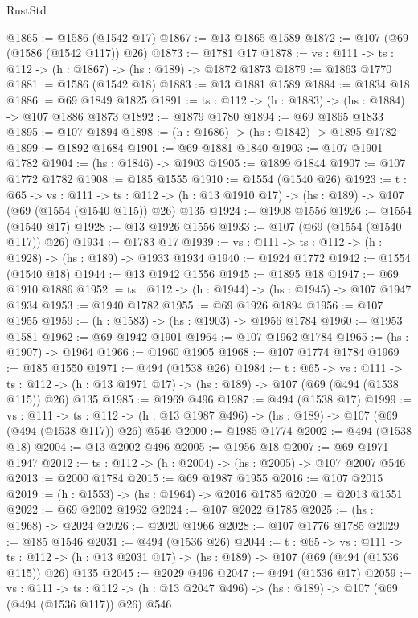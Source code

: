 \begin{lexlean}{RustStd}
\begin{coremodule}
@1865 := @1586 (@1542 @17)
@1867 := @13 @1865 @1589
@1872 := @107 (@69 (@1586 (@1542 @117)) @26)
@1873 := @1781 @17
@1878 := {vs : @111} -> {ts : @112} -> (h : @1867) -> (hs : @189) -> @1872 @1873
@1879 := @1863 @1770
@1881 := @1586 (@1542 @18)
@1883 := @13 @1881 @1589
@1884 := @1834 @18
@1886 := @69 @1849 @1825
@1891 := {ts : @112} -> (h : @1883) -> (hs : @1884) -> @107 @1886 @1873
@1892 := @1879 @1780
@1894 := @69 @1865 @1833
@1895 := @107 @1894
@1898 := (h : @1686) -> (hs : @1842) -> @1895 @1782
@1899 := @1892 @1684
@1901 := @69 @1881 @1840
@1903 := @107 @1901 @1782
@1904 := (hs : @1846) -> @1903
@1905 := @1899 @1844
@1907 := @107 @1772 @1782
@1908 := @185 @1555
@1910 := @1554 (@1540 @26)
@1923 := {t : @65} ->
  {vs : @111} ->
  {ts : @112} -> (h : @13 @1910 @17) -> (hs : @189) -> @107 (@69 (@1554 (@1540 @115)) @26) @135
@1924 := @1908 @1556
@1926 := @1554 (@1540 @17)
@1928 := @13 @1926 @1556
@1933 := @107 (@69 (@1554 (@1540 @117)) @26)
@1934 := @1783 @17
@1939 := {vs : @111} -> {ts : @112} -> (h : @1928) -> (hs : @189) -> @1933 @1934
@1940 := @1924 @1772
@1942 := @1554 (@1540 @18)
@1944 := @13 @1942 @1556
@1945 := @1895 @18
@1947 := @69 @1910 @1886
@1952 := {ts : @112} -> (h : @1944) -> (hs : @1945) -> @107 @1947 @1934
@1953 := @1940 @1782
@1955 := @69 @1926 @1894
@1956 := @107 @1955
@1959 := (h : @1583) -> (hs : @1903) -> @1956 @1784
@1960 := @1953 @1581
@1962 := @69 @1942 @1901
@1964 := @107 @1962 @1784
@1965 := (hs : @1907) -> @1964
@1966 := @1960 @1905
@1968 := @107 @1774 @1784
@1969 := @185 @1550
@1971 := @494 (@1538 @26)
@1984 := {t : @65} ->
  {vs : @111} ->
  {ts : @112} -> (h : @13 @1971 @17) -> (hs : @189) -> @107 (@69 (@494 (@1538 @115)) @26) @135
@1985 := @1969 @496
@1987 := @494 (@1538 @17)
@1999 := {vs : @111} ->
  {ts : @112} -> (h : @13 @1987 @496) -> (hs : @189) -> @107 (@69 (@494 (@1538 @117)) @26) @546
@2000 := @1985 @1774
@2002 := @494 (@1538 @18)
@2004 := @13 @2002 @496
@2005 := @1956 @18
@2007 := @69 @1971 @1947
@2012 := {ts : @112} -> (h : @2004) -> (hs : @2005) -> @107 @2007 @546
@2013 := @2000 @1784
@2015 := @69 @1987 @1955
@2016 := @107 @2015
@2019 := (h : @1553) -> (hs : @1964) -> @2016 @1785
@2020 := @2013 @1551
@2022 := @69 @2002 @1962
@2024 := @107 @2022 @1785
@2025 := (hs : @1968) -> @2024
@2026 := @2020 @1966
@2028 := @107 @1776 @1785
@2029 := @185 @1546
@2031 := @494 (@1536 @26)
@2044 := {t : @65} ->
  {vs : @111} ->
  {ts : @112} -> (h : @13 @2031 @17) -> (hs : @189) -> @107 (@69 (@494 (@1536 @115)) @26) @135
@2045 := @2029 @496
@2047 := @494 (@1536 @17)
@2059 := {vs : @111} ->
  {ts : @112} -> (h : @13 @2047 @496) -> (hs : @189) -> @107 (@69 (@494 (@1536 @117)) @26) @546

\end{coremodule}
\end{lexlean}

